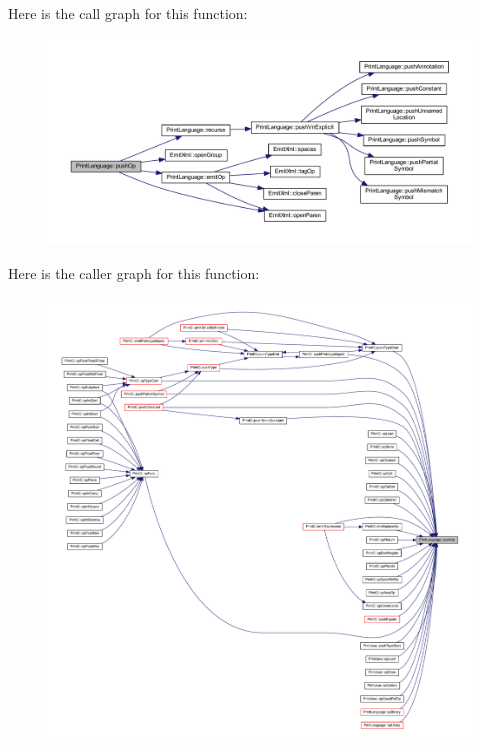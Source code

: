 Here is the call graph for this function\+:
\nopagebreak
\begin{figure}[H]
\begin{center}
\leavevmode
\includegraphics[width=350pt]{class_print_language_abe1affc823865f4379d27121c39e5880_cgraph}
\end{center}
\end{figure}
Here is the caller graph for this function\+:
\nopagebreak
\begin{figure}[H]
\begin{center}
\leavevmode
\includegraphics[width=350pt]{class_print_language_abe1affc823865f4379d27121c39e5880_icgraph}
\end{center}
\end{figure}
\mbox{\label{class_print_language_a918310a27fdef5cde48b3fe6e4c7999f}} 
